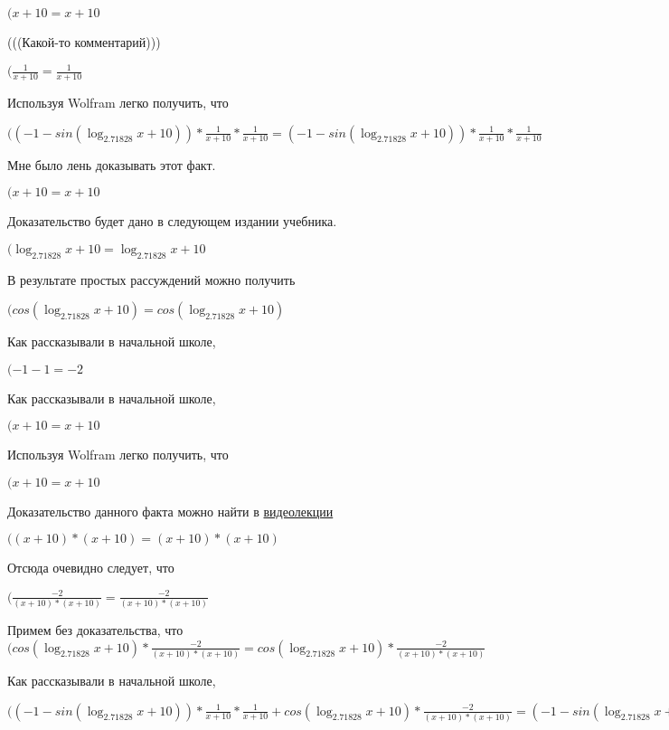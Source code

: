 \documentclass[12pt,a4paper,fleqn]{article}
\theoremstyle{definition}
\begin{document}
$( x  +  10  =  x  +  10 $

(((Какой-то комментарий)))

$(\frac{ 1 }{ x  +  10 }
 = \frac{ 1 }{ x  +  10 }
$

Используя Wolfram легко получить, что

$(( -1  - sin(\log_{ 2.71828 }{ x  +  10 })) * \frac{ 1 }{ x  +  10 }
 * \frac{ 1 }{ x  +  10 }
 = ( -1  - sin(\log_{ 2.71828 }{ x  +  10 })) * \frac{ 1 }{ x  +  10 }
 * \frac{ 1 }{ x  +  10 }
$

Мне было лень доказывать этот факт.

$( x  +  10  =  x  +  10 $

Доказательство будет дано в следующем издании учебника.

$(\log_{ 2.71828 }{ x  +  10 } = \log_{ 2.71828 }{ x  +  10 }$

В результате простых рассуждений можно получить

$(cos(\log_{ 2.71828 }{ x  +  10 }) = cos(\log_{ 2.71828 }{ x  +  10 })$

Как рассказывали в начальной школе,

$( -1  -  1  =  -2 $

Как рассказывали в начальной школе,

$( x  +  10  =  x  +  10 $

Используя Wolfram легко получить, что

$( x  +  10  =  x  +  10 $

Доказательство данного факта можно найти в \href{https://www.youtube.com/watch?v=dQw4w9WgXcQ}{видеолекции}

$(( x  +  10 ) * ( x  +  10 ) = ( x  +  10 ) * ( x  +  10 )$

Отсюда очевидно следует, что

$(\frac{ -2 }{( x  +  10 ) * ( x  +  10 )}
 = \frac{ -2 }{( x  +  10 ) * ( x  +  10 )}
$

Примем без доказательства, что
$(cos(\log_{ 2.71828 }{ x  +  10 }) * \frac{ -2 }{( x  +  10 ) * ( x  +  10 )}
 = cos(\log_{ 2.71828 }{ x  +  10 }) * \frac{ -2 }{( x  +  10 ) * ( x  +  10 )}
$

Как рассказывали в начальной школе,

$(( -1  - sin(\log_{ 2.71828 }{ x  +  10 })) * \frac{ 1 }{ x  +  10 }
 * \frac{ 1 }{ x  +  10 }
 + cos(\log_{ 2.71828 }{ x  +  10 }) * \frac{ -2 }{( x  +  10 ) * ( x  +  10 )}
 = ( -1  - sin(\log_{ 2.71828 }{ x  +  10 })) * \frac{ 1 }{ x  +  10 }
 * \frac{ 1 }{ x  +  10 }
 + cos(\log_{ 2.71828 }{ x  +  10 }) * \frac{ -2 }{( x  +  10 ) * ( x  +  10 )}
$
\end{document}
